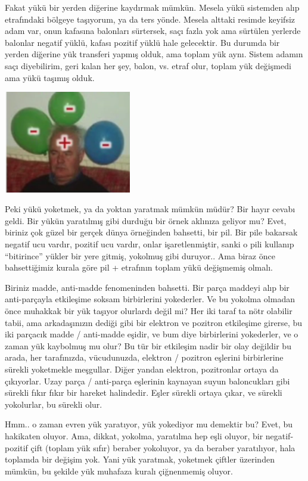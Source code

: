 \documentclass[12pt,fleqn]{article}\usepackage{../../common}
\begin{document}
Fakat yükü bir yerden diğerine kaydırmak mümkün. Mesela yükü sistemden alıp
etrafındaki bölgeye taşıyorum, ya da ters yönde. Mesela alttaki resimde keyifsiz
adam var, onun kafasına balonları sürtersek, saçı fazla yok ama sürtülen
yerlerde balonlar negatif yüklü, kafası pozitif yüklü hale gelecektir. Bu
durumda bir yerden diğerine yük transferi yapmış olduk, ama toplam yük
aynı. Sistem adamın saçı diyebilirim, geri kalan her şey, balon, vs. etraf olur,
toplam yük değişmedi ama yükü taşımış olduk.

\includegraphics[width=15em]{03_02.png}

Peki yükü yoketmek, ya da yoktan yaratmak mümkün müdür? Bir hayır cevabı
geldi. Bir yükün yaratılmış gibi durduğu bir örnek aklınıza geliyor mu? Evet,
biriniz çok güzel bir gerçek dünya örneğinden bahsetti, bir pil. Bir pile
bakarsak negatif ucu vardır, pozitif ucu vardır, onlar işaretlenmiştir, sanki o
pili kullanıp ``bitirince'' yükler bir yere gitmiş, yokolmuş gibi duruyor.. Ama
biraz önce bahsettiğimiz kurala göre pil + etrafının toplam yükü değişmemiş
olmalı.

Biriniz madde, anti-madde fenomeninden bahsetti. Bir parça maddeyi alıp bir
anti-parçayla etkileşime soksam birbirlerini yokederler. Ve bu yokolma olmadan
önce muhakkak bir yük taşıyor olurlardı değil mi? Her iki taraf ta nötr olabilir
tabii, ama arkadaşınızın dediği gibi bir elektron ve pozitron etkileşime
girerse, bu iki parçacık madde / anti-madde eşidir, ve bum diye birbirlerini
yokederler, ve o zaman yük kaybolmuş mu olur? Bu tür bir etkileşim nadir bir
olay değildir bu arada, her tarafınızda, vücudunuzda, elektron / pozitron
eşlerini birbirlerine sürekli yoketmekle meşgullar. Diğer yandan elektron,
pozitronlar ortaya da çıkıyorlar. Uzay parça / anti-parça eşlerinin kaynayan
suyun baloncukları gibi sürekli fıkır fıkır bir hareket halindedir. Eşler
sürekli ortaya çıkar, ve sürekli yokolurlar, bu sürekli olur.

Hmm.. o zaman evren yük yaratıyor, yük yokediyor mu demektir bu? Evet, bu
hakikaten oluyor. Ama, dikkat, yokolma, yaratılma hep eşli oluyor, bir
negatif-pozitif çift (toplam yük sıfır) beraber yokoluyor, ya da beraber
yaratılıyor, hala toplamda bir değişim yok. Yani yük yaratmak, yoketmek çiftler
üzerinden mümkün, bu şekilde yük muhafaza kuralı çiğnenmemiş oluyor.
\end{document}
